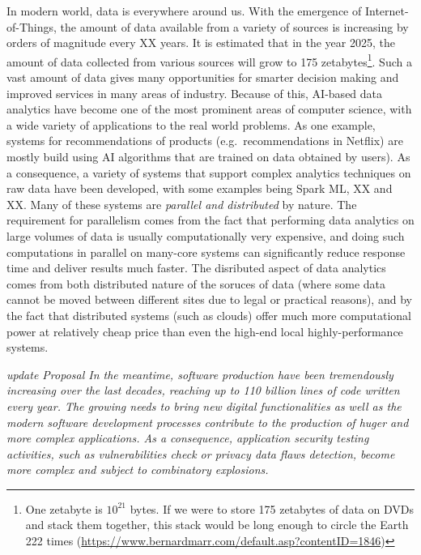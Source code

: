 \documentclass[a4paper,11pt]{article}
\begin{document}
In modern world, data is everywhere around us. With the emergence of Internet-of-Things, the amount of data available from a variety of sources is increasing by orders of magnitude every XX years. It is estimated that in the year 2025, the amount of data collected from various sources will grow to 175 zetabytes\footnote{One zetabyte is $10^{21}$ bytes. If we were to store 175 zetabytes of data on DVDs and stack them together, this stack would be long enough to circle the Earth 222 times (\url{https://www.bernardmarr.com/default.asp?contentID=1846})}. Such a vast amount of data gives many opportunities for smarter decision making and improved services in many areas of industry. Because of this, AI-based data analytics have become one of the most prominent areas of computer science, with a wide variety of applications to the real world problems. As one example, systems for recommendations of products (e.g.~recommendations in Netflix) are mostly build using AI algorithms that are trained on data obtained by users). As a consequence, a variety of systems that support complex analytics techniques on raw data have been developed, with some examples being Spark ML, XX and XX. Many of these systems are \emph{parallel and distributed} by nature. The requirement for parallelism comes from the fact that performing data analytics on large volumes of data is usually computationally very expensive, and doing such computations in parallel on many-core systems can significantly reduce response time and deliver results much faster. The disributed aspect of data analytics comes from both distributed nature of the soruces of data (where some data cannot be moved between different sites due to legal or practical reasons), and by the fact that distributed systems (such as clouds) offer much more computational power at relatively cheap price than even the high-end local highly-performance systems. 

\textit{
{\color{blue} \YAGshort{} update Proposal} In the meantime, software production have been tremendously increasing over the last decades, reaching up to 110 billion lines of code written every year. The growing needs to bring new digital functionalities as well as the modern software development processes contribute to the production of huger and more complex applications. As a consequence, application security testing activities, such as vulnerabilities check or privacy data flaws detection, become more complex and subject to combinatory explosions.
}
\end{document}
